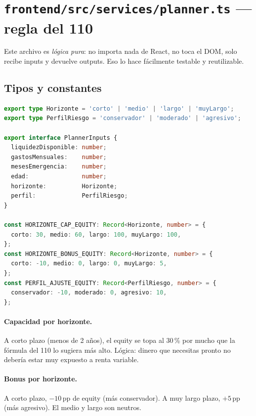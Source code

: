 \documentclass[11pt,a4paper]{book}
\begin{document}
\section{\texttt{frontend/src/services/planner.ts} --- regla del 110}

Este archivo es \emph{lógica pura}: no importa nada de React, no toca el DOM, solo recibe inputs y devuelve outputs. Eso lo hace fácilmente testable y reutilizable.

\subsection{Tipos y constantes}

\begin{lstlisting}[language=TypeScript]
export type Horizonte = 'corto' | 'medio' | 'largo' | 'muyLargo';
export type PerfilRiesgo = 'conservador' | 'moderado' | 'agresivo';

export interface PlannerInputs {
  liquidezDisponible: number;
  gastosMensuales:    number;
  mesesEmergencia:    number;
  edad:               number;
  horizonte:          Horizonte;
  perfil:             PerfilRiesgo;
}

const HORIZONTE_CAP_EQUITY: Record<Horizonte, number> = {
  corto: 30, medio: 60, largo: 100, muyLargo: 100,
};
const HORIZONTE_BONUS_EQUITY: Record<Horizonte, number> = {
  corto: -10, medio: 0, largo: 0, muyLargo: 5,
};
const PERFIL_AJUSTE_EQUITY: Record<PerfilRiesgo, number> = {
  conservador: -10, moderado: 0, agresivo: 10,
};
\end{lstlisting}

\paragraph{Capacidad por horizonte.} A corto plazo (menos de 2 años), el equity se topa al 30\,\% por mucho que la fórmula del 110 lo sugiera más alto. Lógica: dinero que necesitas pronto no debería estar muy expuesto a renta variable.

\paragraph{Bonus por horizonte.} A corto plazo, $-10$\,pp de equity (más conservador). A muy largo plazo, $+5$\,pp (más agresivo). El medio y largo son neutros.
\end{document}
